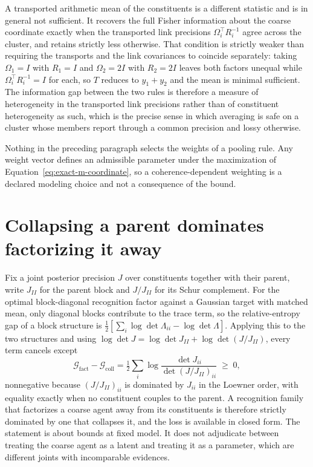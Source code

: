 A transported arithmetic mean of the constituents is a different statistic and is in general not sufficient. It recovers the full Fisher information about the coarse coordinate exactly when the transported link precisions \(\Omega_i^{\top}R_i^{-1}\) agree across the cluster, and retains strictly less otherwise. That condition is strictly weaker than requiring the transports and the link covariances to coincide separately: taking \(\Omega_1=I\) with \(R_1=I\) and \(\Omega_2=2I\) with \(R_2=2I\) leaves both factors unequal while \(\Omega_i^{\top}R_i^{-1}=I\) for each, so \(T\) reduces to \(y_1+y_2\) and the mean is minimal sufficient. The information gap between the two rules is therefore a measure of heterogeneity in the transported link precisions rather than of constituent heterogeneity as such, which is the precise sense in which averaging is safe on a cluster whose members report through a common precision and lossy otherwise.

Nothing in the preceding paragraph selects the weights of a pooling rule. Any weight vector defines an admissible parameter under the maximization of Equation~\eqref{eq:exact-m-coordinate}, so a coherence-dependent weighting is a declared modeling choice and not a consequence of the bound.

\section{Collapsing a parent dominates factorizing it away}

Fix a joint posterior precision \(J\) over constituents together with their parent, write \(J_{II}\) for the parent block and \(J/J_{II}\) for its Schur complement. For the optimal block-diagonal recognition factor against a Gaussian target with matched mean, only diagonal blocks contribute to the trace term, so the relative-entropy gap of a block structure is \(\tfrac12[\sum_i\log\det\Lambda_{ii}-\log\det\Lambda]\). Applying this to the two structures and using \(\log\det J=\log\det J_{II}+\log\det(J/J_{II})\), every term cancels except
\begin{equation}
\mathcal G_{\mathrm{fact}}-\mathcal G_{\mathrm{coll}}
=\tfrac12\sum_i\log
\frac{\det J_{ii}}{\det (J/J_{II})_{ii}}
\;\geq\;0,
\label{eq:coarse-collapse-domination}
\end{equation}
nonnegative because \((J/J_{II})_{ii}\) is dominated by \(J_{ii}\) in the Loewner order, with equality exactly when no constituent couples to the parent. A recognition family that factorizes a coarse agent away from its constituents is therefore strictly dominated by one that collapses it, and the loss is available in closed form. The statement is about bounds at fixed model. It does not adjudicate between treating the coarse agent as a latent and treating it as a parameter, which are different joints with incomparable evidences.

